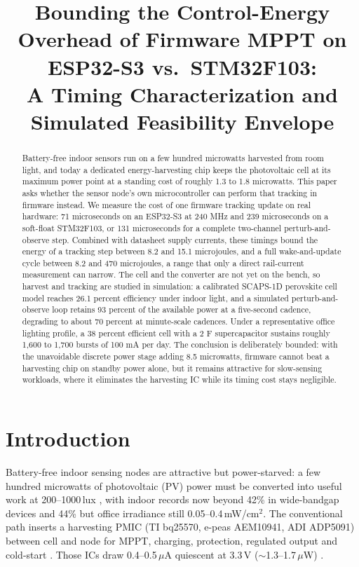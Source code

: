 \documentclass[10pt, conference, letterpaper]{IEEEtran}
\title{Bounding the Control-Energy Overhead of Firmware MPPT on ESP32-S3 vs.\ STM32F103:\\A Timing Characterization and Simulated Feasibility Envelope}
\author{\IEEEauthorblockN{Touhid Siddique Eraj}
\IEEEauthorblockA{\textit{Independent Researcher}\\
Dhaka, Bangladesh\\
\texttt{github.com/touhidsiddiqueeraj-bit}}}
\begin{document}
\maketitle

\begin{abstract}
Battery-free indoor sensors run on a few hundred microwatts harvested from room light, and today a dedicated energy-harvesting chip keeps the photovoltaic cell at its maximum power point at a standing cost of roughly 1.3 to 1.8 microwatts. This paper asks whether the sensor node's own microcontroller can perform that tracking in firmware instead. We measure the cost of one firmware tracking update on real hardware: 71 microseconds on an ESP32-S3 at 240 MHz and 239 microseconds on a soft-float STM32F103, or 131 microseconds for a complete two-channel perturb-and-observe step. Combined with datasheet supply currents, these timings bound the energy of a tracking step between 8.2 and 15.1 microjoules, and a full wake-and-update cycle between 8.2 and 470 microjoules, a range that only a direct rail-current measurement can narrow. The cell and the converter are not yet on the bench, so harvest and tracking are studied in simulation: a calibrated SCAPS-1D perovskite cell model reaches 26.1 percent efficiency under indoor light, and a simulated perturb-and-observe loop retains 93 percent of the available power at a five-second cadence, degrading to about 70 percent at minute-scale cadences. Under a representative office lighting profile, a 38 percent efficient cell with a 2 F supercapacitor sustains roughly 1,600 to 1,700 bursts of 100 mA per day. The conclusion is deliberately bounded: with the unavoidable discrete power stage adding 8.5 microwatts, firmware cannot beat a harvesting chip on standby power alone, but it remains attractive for slow-sensing workloads, where it eliminates the harvesting IC while its timing cost stays negligible.
\end{abstract}

\section{Introduction}

Battery-free indoor sensing nodes are attractive but power-starved: a few hundred microwatts of photovoltaic (PV) power must be converted into useful work at 200--1000\,lux \cite{ariken2023indoor,mateen2023indoor,freunek2013indoor,derossi2015indoor,mathews2019indoor}, with indoor records now beyond 42\% in wide-bandgap devices \cite{chen2024indoor42} and 44\% \cite{ma2024record,xu2026progress} but office irradiance still 0.05--0.4\,mW/cm$^2$. The conventional path inserts a harvesting PMIC (TI bq25570, e-peas AEM10941, ADI ADP5091) between cell and node for MPPT, charging, protection, regulated output and cold-start \cite{ti_bq25570,ep_aem10941,adi_adp5091}. Those ICs draw 0.4--0.5\,$\mu$A quiescent at 3.3\,V ($\sim$1.3--1.7\,$\mu$W) \cite{vullers2009micropower}.
\end{document}
